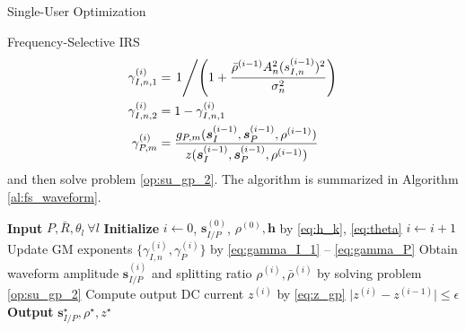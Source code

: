 \documentclass{IEEEtran}
\begin{document}
\begin{section}{Single-User Optimization}
\begin{subsection}{Frequency-Selective IRS}
		\begin{align}
			\gamma_{I,n,1}^{(i)} & = \left. 1 \middle/ \left(1+\frac{\bar{\rho}^{(i-1)}{A_n^2}(s_{I,n}^{(i-1)})^2}{\sigma_n^2}\right) \right.\label{eq:gamma_I_1}\\
			\gamma_{I,n,2}^{(i)} & = 1 - \gamma_{I,n,1}^{(i)}\label{eq:gamma_I_2}\\
			\gamma_{P,m}^{(i)} & =\frac{g_{P,m}(\boldsymbol{s}_I^{(i-1)},\boldsymbol{s}_P^{(i-1)},\rho^{(i-1)})}{z(\boldsymbol{s}_I^{(i-1)},\boldsymbol{s}_P^{(i-1)},\rho^{(i-1)})}\label{eq:gamma_P}
		\end{align}
		and then solve problem \ref{op:su_gp_2}. The algorithm is summarized in Algorithm \ref{al:fs_waveform}.
		\begin{algorithm}
			\caption{FS-IRS: Waveform Amplitude Optimization}
			\label{al:fs_waveform}
			\begin{algorithmic}[1]
				\State \textbf{Input} $P, \bar{R}, \theta_l \ \forall l$
				\State \textbf{Initialize} $i \leftarrow 0$, $\boldsymbol{s}_{I/P}^{(0)}$, $\rho^{(0)}, \boldsymbol{h}$ by \ref{eq:h_k}, \ref{eq:theta}
				\Repeat
				\State $i \leftarrow i + 1$
				\State Update GM exponents $\{\gamma_{I,n}^{(i)},\gamma_{P}^{(i)}\}$ by \ref{eq:gamma_I_1} -- \ref{eq:gamma_P}
				\State Obtain waveform amplitude $\boldsymbol{s}_{I/P}^{(i)}$ and splitting ratio $\rho^{(i)}, \bar{\rho}^{(i)}$ by solving problem \ref{op:su_gp_2}
				\State Compute output DC current $z^{(i)}$ by \ref{eq:z_gp}
				\Until $\lvert z^{(i)} - z^{(i-1)} \rvert \le \epsilon$
				\State \textbf{Output} $\boldsymbol{s}_{I/P}^{\star}, \rho^{\star}, z^{\star}$
			\end{algorithmic}
		\end{algorithm}
	\end{subsection}


\end{section}
\end{document}

